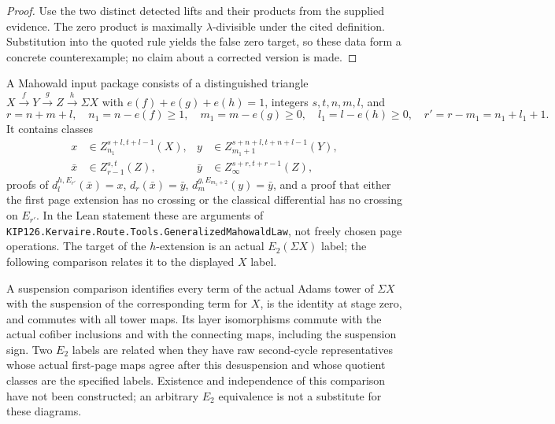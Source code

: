\begin{proof}
  Use the two distinct detected lifts and their products from the supplied
  evidence.  The zero product is maximally $\lambda$-divisible under the cited
  definition.  Substitution into the quoted rule yields the false zero target,
  so these data form a concrete counterexample; no claim about a corrected
  version is made.
\end{proof}

\begin{definition}
  \label{def:mahowald-input-data}
  \notready
  A Mahowald input package consists of a distinguished triangle
  $X\xrightarrow fY\xrightarrow gZ\xrightarrow h\Sigma X$ with
  $e(f)+e(g)+e(h)=1$, integers $s,t,n,m,l$, and
  \[
    r=n+m+l,\quad n_1=n-e(f)\ge1,\quad
    m_1=m-e(g)\ge0,\quad l_1=l-e(h)\ge0,\quad
    r'=r-m_1=n_1+l_1+1.
  \]
  It contains classes
  \[
  \begin{aligned}
    x&\in Z_{n_1}^{s+l,t+l-1}(X),&
    y&\in Z_{m_1+1}^{s+n+l,t+n+l-1}(Y),\\
    \bar x&\in Z_{r-1}^{s,t}(Z),&
    \bar y&\in Z_\infty^{s+r,t+r-1}(Z),
  \end{aligned}
  \]
  proofs of $d_l^{h,E_{r'}}(\bar x)=x$, $d_r(\bar x)=\bar y$,
  $d_m^{g,E_{m_1+2}}(y)=\bar y$, and a proof that either the first page
  extension has no crossing or the classical differential has no crossing on
  $E_{r'}$.
  In the Lean statement these are arguments of
  \texttt{KIP126.Kervaire.Route.Tools.GeneralizedMahowaldLaw}, not freely chosen page
  operations. The target of the $h$-extension is an actual $E_2(\Sigma X)$
  label; the following comparison relates it to the displayed $X$ label.
\end{definition}

\begin{definition}
  \label{def:mahowald-tower-suspension-comparison}
  \notready
  A suspension comparison identifies every term of the actual Adams tower
  of $\Sigma X$ with the suspension of the corresponding term for $X$,
  is the identity at stage zero, and commutes with all tower maps. Its
  layer isomorphisms commute with the actual cofiber inclusions and with
  the connecting maps, including the suspension sign. Two $E_2$ labels
  are related when they have raw second-cycle representatives whose
  actual first-page maps agree after this desuspension and whose quotient
  classes are the specified labels. Existence and independence of this
  comparison have not been constructed; an arbitrary $E_2$ equivalence
  is not a substitute for these diagrams.
\end{definition}

